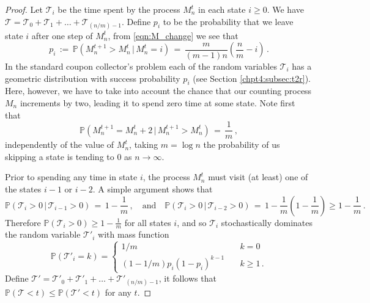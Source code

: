 \documentclass[11pt]{report}
\begin{document}
\begin{proof}
	Let $\mathcal{T}_{i}$ be the time spent by the process 
	${M}^{t}_{n}$ in each state $i\ge0$. We have $\mathcal{T} = 
	\mathcal{T}_{0} + \mathcal{T}_{1} + \dots + 
	\mathcal{T}_{(n/m)-1}$. Define $p_{i}$ to be the probability that we leave state $i$ after one step of $M_{n}^{t}$, from \eqref{eqn:M_change} we see that 
	\begin{equation}\label{eqn:M_up}
	p_i\,:=\,\mathbb{P}({M}^{t+1}_{n} > {M}^{t}_{n}\,|\, M_n^t = i) \,=\, 
	\frac{m}{(m-1)n}\left(\frac{n}{m}-i\right)\,.
	\end{equation}
	In the standard coupon collector's problem each of the random variables 
	$\mathcal T_i$ has a geometric distribution with success probability 
	$p_i$ (see Section \ref{chpt4:subsec:t2r}). Here, however, we have to take into account the chance that our 
	counting process $M_n$ increments by two, leading it to spend zero time 
	at some state. Note first that 
	\[\mathbb{P}({M}^{t+1}_{n} ={M}^{t}_{n} + 2 \,|\, {M}^{t+1}_{n} > 
	{M}^{t}_{n}) \,=\, \frac{1}{m}\,,\]
	independently of the value of $M_n^t$, taking $m=\log n$ the probability of us skipping a state is tending to $0$ as $n\to \infty$. 
	
	
	Prior to spending any time in state $i$, the process ${M}^{t}_{n}$ must 
	visit (at least) one of the states $i-1$ or $i-2$. A simple argument 
	shows that 
	\[ \mathbb{P}(\mathcal{T}_{i}>0\, | \,\mathcal{T}_{i-1}>0) \,=\, 1- 
	\frac{1}{m}\,,\quad\text{and}\quad
	\mathbb{P}(\mathcal{T}_{i}>0\, |\, \mathcal{T}_{i-2}>0) \,=\, 1- 
	\frac{1}{m}\left(1-\frac{1}{m}\right) \ge 1-\frac 1m\,. \]
	Therefore $\mathbb{P}(\mathcal T_i>0) \ge 1-\frac{1}{m}$ for all states 
	$i$, and so $\mathcal{T}_i$ stochastically dominates the random 
	variable $\mathcal T'_i$ with mass function
	\begin{equation}\label{eqn:Tprime}
	\mathbb P(\mathcal T'_i = k) = \begin{cases}
	1/m &\quad k=0 \\
	(1-1/m)p_i(1-p_i)^{k-1} &\quad k\ge 1\,.
	\end{cases}
	\end{equation}
	Define  $\mathcal T' = \mathcal{T}'_{0} + \mathcal{T}'_{1} + 
	\dots + \mathcal{T}'_{(n/m)-1}$, it  follows that $\mathbb P(\mathcal T<t) \le \mathbb P(\mathcal T'<t)$ 
	for any $t$.
	

\end{proof}
\end{document}
